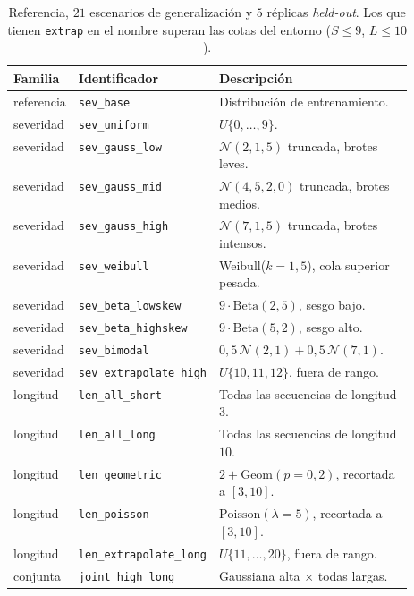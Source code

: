 \documentclass[../00_Main/Main.tex]{subfiles}
\begin{document}
\begin{table}[!htb]
\centering
\caption[Escenarios de evaluaci\'on]{Referencia, $21$ escenarios de
generalizaci\'on y $5$ r\'eplicas \emph{held-out}. Los que tienen
\texttt{extrap} en el nombre superan las cotas del entorno ($S \le 9$,
$L \le 10$).}
\label{tab:scenarios}
\small
\begin{tabular}{@{}llp{0.52\linewidth}@{}}
\toprule
\textbf{Familia} & \textbf{Identificador} & \textbf{Descripci\'on} \\
\midrule
referencia    & \texttt{sev\_base}             & Distribuci\'on de entrenamiento.\\
\midrule
severidad     & \texttt{sev\_uniform}          & $U\{0, \ldots, 9\}$.\\
severidad     & \texttt{sev\_gauss\_low}       & $\mathcal{N}(2, 1{,}5)$ truncada, brotes leves.\\
severidad     & \texttt{sev\_gauss\_mid}       & $\mathcal{N}(4{,}5, 2{,}0)$ truncada, brotes medios.\\
severidad     & \texttt{sev\_gauss\_high}      & $\mathcal{N}(7, 1{,}5)$ truncada, brotes intensos.\\
severidad     & \texttt{sev\_weibull}          & Weibull($k=1{,}5$), cola superior pesada.\\
severidad     & \texttt{sev\_beta\_lowskew}    & $9 \cdot \mathrm{Beta}(2, 5)$, sesgo bajo.\\
severidad     & \texttt{sev\_beta\_highskew}   & $9 \cdot \mathrm{Beta}(5, 2)$, sesgo alto.\\
severidad     & \texttt{sev\_bimodal}          & $0{,}5\,\mathcal{N}(2, 1) + 0{,}5\,\mathcal{N}(7, 1)$.\\
severidad     & \texttt{sev\_extrapolate\_high}& $U\{10, 11, 12\}$, fuera de rango.\\
\midrule
longitud      & \texttt{len\_all\_short}       & Todas las secuencias de longitud $3$.\\
longitud      & \texttt{len\_all\_long}        & Todas las secuencias de longitud $10$.\\
longitud      & \texttt{len\_geometric}        & $2 + \mathrm{Geom}(p = 0{,}2)$, recortada a $[3, 10]$.\\
longitud      & \texttt{len\_poisson}          & $\mathrm{Poisson}(\lambda = 5)$, recortada a $[3, 10]$.\\
longitud      & \texttt{len\_extrapolate\_long}& $U\{11, \ldots, 20\}$, fuera de rango.\\
\midrule
conjunta      & \texttt{joint\_high\_long}     & Gaussiana alta $\times$ todas largas.\\

\end{tabular}
\end{table}
\end{document}
